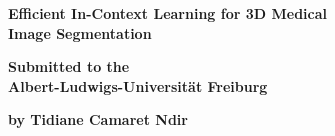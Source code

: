 

\vspace*{0.1cm}
\noindent\LARGE{\textbf{Efficient In-Context Learning for 3D Medical\\Image Segmentation}}

\vspace{2cm}
\noindent\Large{\textbf{Submitted to the \\Albert-Ludwigs-Universität Freiburg}}

\vspace{2cm}
\noindent\Large{\textbf{by Tidiane Camaret Ndir}}


